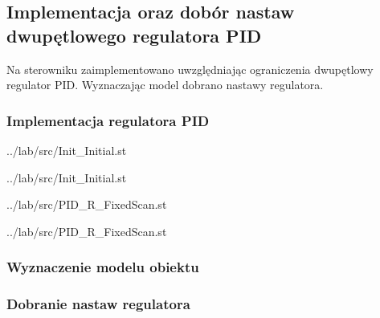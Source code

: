 \subsection{Implementacja oraz dobór nastaw dwupętlowego regulatora PID}
\label{lab:zad3}


\ifdefined\CompileFigures
%    
\fi

Na	sterowniku	zaimplementowano	uwzględniając	ograniczenia	dwupętlowy	
regulator	PID. Wyznaczając model dobrano nastawy regulatora.

\subsubsection{Implementacja regulatora PID}

\ifdefined\CompileListings
    
        {../lab/src/Init_Initial.st}
\fi

\ifdefined\CompileListings
    
        {../lab/src/Init_Initial.st}
    \newpage
\fi

\ifdefined\CompileListings
    
        {../lab/src/PID_R_FixedScan.st}
    \newpage
\fi

\ifdefined\CompileListings
    
        {../lab/src/PID_R_FixedScan.st}
    \newpage
\fi

\subsubsection{Wyznaczenie modelu obiektu}


\subsubsection{Dobranie nastaw regulatora}




\newpage
